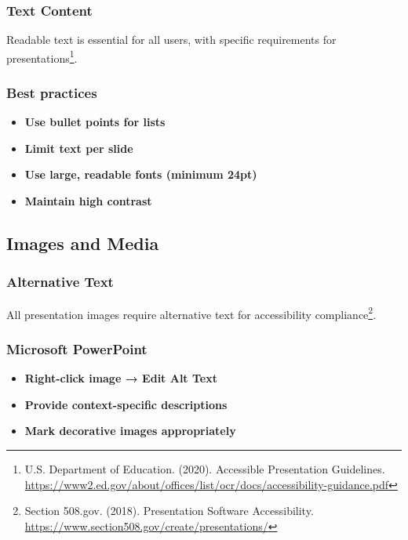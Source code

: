 \subsubsection{Text Content}
Readable text is essential for all users, with specific requirements for presentations\footnote{U.S. Department of Education. (2020). Accessible Presentation Guidelines. \url{https://www2.ed.gov/about/offices/list/ocr/docs/accessibility-guidance.pdf}}.

\subsubsection{Best practices}
\vspace{1em}
\begin{itemize}
\item \textbf{Use bullet points for lists}
\item \textbf{Limit text per slide}
\item \textbf{Use large, readable fonts (minimum 24pt)}
\item \textbf{Maintain high contrast}
\end{itemize}
\vspace{1em}

\subsection{Images and Media}

\subsubsection{Alternative Text}
All presentation images require alternative text for accessibility compliance\footnote{Section 508.gov. (2018). Presentation Software Accessibility. \url{https://www.section508.gov/create/presentations/}}.

\subsubsection{Microsoft PowerPoint}
\vspace{1em}
\begin{itemize}
\item \textbf{Right-click image → Edit Alt Text}
\item \textbf{Provide context-specific descriptions}
\item \textbf{Mark decorative images appropriately}
\end{itemize}
\vspace{1em}

